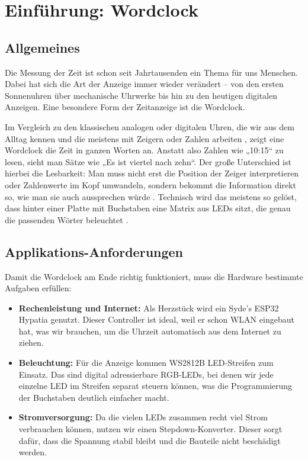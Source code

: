 %
%
%

\chapter{Einführung: Wordclock}

\section{Allgemeines}
Die Messung der Zeit ist schon seit Jahrtausenden ein Thema für uns Menschen. Dabei hat sich die Art der Anzeige immer wieder verändert – von den ersten Sonnenuhren über mechanische Uhrwerke bis hin zu den heutigen digitalen Anzeigen. Eine besondere Form der Zeitanzeige ist die Wordclock.\\


Im Vergleich zu den klassischen analogen oder digitalen Uhren, die wir aus dem Alltag kennen und die meistens mit Zeigern oder Zahlen arbeiten 
, zeigt eine Wordclock die Zeit in ganzen Worten an. Anstatt also Zahlen wie „10:15“ zu lesen, sieht man Sätze wie „Es ist viertel nach zehn“. Der große Unterschied ist hierbei die Lesbarkeit: Man muss nicht erst die Position der Zeiger interpretieren oder Zahlenwerte im Kopf umwandeln, sondern bekommt die Information direkt so, wie man sie auch aussprechen würde . Technisch wird das meistens so gelöst, dass hinter einer Platte mit Buchstaben eine Matrix aus LEDs sitzt, die genau die passenden Wörter beleuchtet .

\section{Applikations-Anforderungen}
Damit die Wordclock am Ende richtig funktioniert, muss die Hardware bestimmte Aufgaben erfüllen:
\begin{itemize}
	\item \textbf{Rechenleistung und Internet:} Als Herzstück wird ein Syde’s ESP32 Hypatia genutzt. Dieser Controller ist ideal, weil er schon WLAN eingebaut hat, was wir brauchen, um die Uhrzeit automatisch aus dem Internet zu ziehen.
	\item \textbf{Beleuchtung:} Für die Anzeige kommen WS2812B LED-Streifen zum Einsatz. Das sind digital adressierbare RGB-LEDs, bei denen wir jede einzelne LED im Streifen separat steuern können, was die Programmierung der Buchstaben deutlich einfacher macht.
	\item \textbf{Stromversorgung:} Da die vielen LEDs zusammen recht viel Strom verbrauchen können, nutzen wir einen Stepdown-Konverter. Dieser sorgt dafür, dass die Spannung stabil bleibt und die Bauteile nicht beschädigt werden.
\end{itemize}


